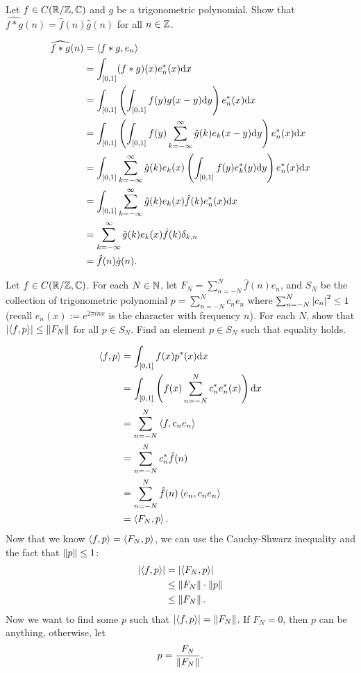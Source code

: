 \documentclass{article}
\begin{document}
\bigskip
\begin{prob}
    Let $f \in C(\mathbb{R}/\mathbb{Z},\mathbb{C})$ and $g$ be a trigonometric polynomial. Show that $\widehat{f * g}(n) = \widehat{f}(n)\widehat{g}(n)$ for all $n \in \mathbb{Z}$.
\end{prob}
\begin{align*}
    \widehat{f*g}(n) &= \left\langle f*g,e_n \right\rangle \\
                     &= \int_{[0,1]} (f*g)(x) e_n^*(x) \mathrm{d} x \\
                     &= \int_{[0,1]} \left( \int_{[0,1]} f(y)g(x-y) \mathrm{d} y \right) e_n^*(x) \mathrm{d} x \\
                     &= \int_{[0,1]} \left( \int_{[0,1]} f(y)\sum_{k=-\infty}^\infty \hat{g}(k) e_k(x-y) \mathrm{d} y \right) e_n^*(x) \mathrm{d} x \\
                     &= \int_{[0,1]} \sum_{k=-\infty}^\infty \hat{g}(k)e_k(x) \left( \int_{[0,1]} f(y) e_k^*(y) \mathrm{d} y \right) e_n^*(x) \mathrm{d} x \\
                     &= \int_{[0,1]} \sum_{k=-\infty}^\infty \hat{g}(k)e_k(x) \hat{f}(k) e_n^*(x) \mathrm{d} x \\
                     &= \sum_{k=-\infty}^\infty \hat{g}(k)e_k(x) \hat{f}(k) \delta_{k,n} \\
                     &=\hat{f}(n) \hat{g}(n).
\end{align*}

\bigskip
\begin{prob}
    
    Let $f \in C(\mathbb{R}/\mathbb{Z}, \mathbb{C})$. For each $N \in \mathbb{N}$, let $F_N = \sum_{n=-N}^N \hat{f}(n) e_n$, and $S_N$ be the collection of trigonometric polynomial $p = \sum_{n=-N}^N c_n e_n$ where $\sum_{n=-N}^N \left\lvert c_n \right\rvert^2 \leq 1$ (recall $e_n(x) := e^{2\pi i n x}$ is the character with frequency $n$). For each $N$, show that $\left\lvert \left\langle f,p \right\rangle \right\rvert \leq \left\lVert F_N\right\rVert$ for all $p \in S_N$. Find an element $p \in S_N$ such that equality holds.
\end{prob}
\begin{align*}
    \left\langle f,p \right\rangle &= \int_{[0,1]} f(x) p^*(x) \mathrm{d} x \\
               &= \int_{[0,1]} \left( f(x) \sum_{n=-N}^N c_n^* e_n^*(x) \right) \mathrm{d} x \\
               &= \sum_{n=-N}^N \left\langle f, c_n e_n \right\rangle \\
               &= \sum_{n=-N}^N c_n^* \hat{f}(n) \\
               &= \sum_{n=-N}^N \hat{f}(n)\left\langle e_n,c_ne_n \right\rangle \\
               &= \left\langle F_N,p \right\rangle.
\end{align*}
Now that we know $\left\langle f,p \right\rangle=\left\langle F_N,p \right\rangle$, we can use the Cauchy-Shwarz inequality and the fact that $\left\lVert p\right\rVert \leq 1$:
\begin{align*}
    \left\lvert \left\langle f,p \right\rangle \right\rvert &= \left\lvert \left\langle F_N,p \right\rangle \right\rvert \\
                     &\leq \left\lVert F_N\right\rVert \cdot \left\lVert p\right\rVert \\
                     &\leq \left\lVert F_N\right\rVert.
\end{align*}
Now we want to find some $p$ such that $\left\lvert \left\langle f,p \right\rangle \right\rvert=\left\lVert F_N\right\rVert$. If $F_N=0$, then $p$ can be anything, otherwise, let
\[ p= \frac{F_N}{\left\lVert F_N\right\rVert}. \]
\end{document}
